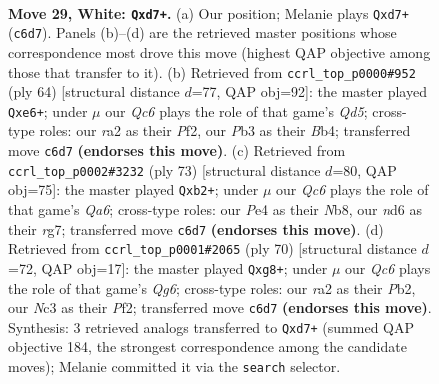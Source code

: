 \documentclass[11pt]{article}
\begin{document}
\clearpage

\begin{figure}[p]\centering
\begin{subfigure}{0.46\textwidth}\centering
\resizebox{\linewidth}{!}{%
\newchessgame
\chessboard[
  setfen={4kb2/3q4/2Qn2p1/2pP4/4P3/1PNK4/r7/8 w - - 0 29},
  showmover=false,
  pgfstyle=straightmove, color=movearrow, markmove={c6-d7}
]}
\caption{}
\end{subfigure}\hfill
\begin{subfigure}{0.46\textwidth}\centering
\resizebox{\linewidth}{!}{%
\newchessgame
\chessboard[
  setfen={8/5k2/4q2p/1n1Qp1p1/1B6/8/5PPP/5bK1 w - - 1 33},
  showmover=false,
  pgfstyle=straightmove, color=movearrow, markmove={d5-e6}
]}
\caption{}
\end{subfigure}
\\[4pt]
\begin{subfigure}{0.46\textwidth}\centering
\resizebox{\linewidth}{!}{%
\newchessgame
\chessboard[
  setfen={1n6/2p3R1/p2k4/3p1b2/2B1pP2/q7/1Q6/2K1B3 b - - 1 37},
  showmover=false,
  pgfstyle=straightmove, color=movearrow, markmove={a3-b2}
]}
\caption{}
\end{subfigure}\hfill
\begin{subfigure}{0.46\textwidth}\centering
\resizebox{\linewidth}{!}{%
\newchessgame
\chessboard[
  setfen={3b2qk/1p6/p5Q1/6P1/7P/8/KPP2P2/8 w - - 1 36},
  showmover=false,
  pgfstyle=straightmove, color=movearrow, markmove={g6-g8}
]}
\caption{}
\end{subfigure}
\caption{\textbf{Move 29, White: \texttt{Qxd7+}.} (a) Our position; Melanie plays \texttt{Qxd7+} (\texttt{c6d7}). Panels (b)--(d) are the retrieved master positions whose correspondence most drove this move (highest QAP objective among those that transfer to it). (b) Retrieved from \texttt{ccrl\_top\_p0000\#952} (ply 64) [structural distance $d$=77, QAP obj=92]: the master played \texttt{Qxe6+}; under $\mu$ our \emph{Qc6} plays the role of that game's \emph{Qd5}; cross-type roles: our \emph{r}a2 as their \emph{P}f2, our \emph{P}b3 as their \emph{B}b4; transferred move \texttt{c6d7} \textbf{(endorses this move)}. (c) Retrieved from \texttt{ccrl\_top\_p0002\#3232} (ply 73) [structural distance $d$=80, QAP obj=75]: the master played \texttt{Qxb2+}; under $\mu$ our \emph{Qc6} plays the role of that game's \emph{Qa6}; cross-type roles: our \emph{P}e4 as their \emph{N}b8, our \emph{n}d6 as their \emph{r}g7; transferred move \texttt{c6d7} \textbf{(endorses this move)}. (d) Retrieved from \texttt{ccrl\_top\_p0001\#2065} (ply 70) [structural distance $d$=72, QAP obj=17]: the master played \texttt{Qxg8+}; under $\mu$ our \emph{Qc6} plays the role of that game's \emph{Qg6}; cross-type roles: our \emph{r}a2 as their \emph{P}b2, our \emph{N}c3 as their \emph{P}f2; transferred move \texttt{c6d7} \textbf{(endorses this move)}. Synthesis: 3 retrieved analogs transferred to \texttt{Qxd7+} (summed QAP objective 184, the strongest correspondence among the candidate moves); Melanie committed it via the \texttt{search} selector.}
\label{fig:thought-m56}
\end{figure}
\end{document}
